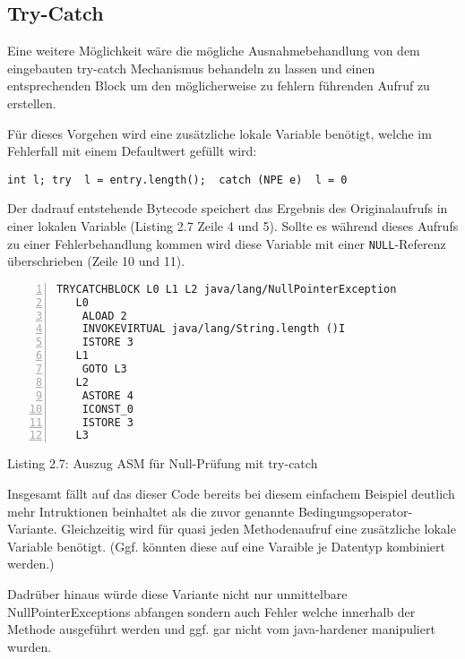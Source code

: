 \vspace{0.3cm}


\subsection{Try-Catch}

Eine weitere Möglichkeit wäre die mögliche Ausnahmebehandlung von dem eingebauten
try-catch Mechanismus behandeln zu lassen und einen entsprechenden Block um
den möglicherweise zu fehlern führenden Aufruf zu erstellen.

Für dieses Vorgehen wird eine zusätzliche lokale Variable benötigt,
welche im Fehlerfall mit einem Defaultwert gefüllt wird:

\texttt{int l; try { l = entry.length(); } catch (NPE e) { l = 0 }}

Der dadrauf entstehende Bytecode speichert das Ergebnis des Originalaufrufs
in einer lokalen Variable (Listing 2.7 Zeile 4 und 5). Sollte es während
dieses Aufrufs zu einer Fehlerbehandlung kommen wird diese Variable mit
einer \texttt{NULL}-Referenz überschrieben (Zeile 10 und 11).


\begin{lstlisting}[basicstyle=\ttfamily,numbers=left,numberstyle=\footnotesize\ttfamily,backgroundcolor=\color{source}]
    TRYCATCHBLOCK L0 L1 L2 java/lang/NullPointerException
   L0
    ALOAD 2
    INVOKEVIRTUAL java/lang/String.length ()I
    ISTORE 3
   L1
    GOTO L3
   L2
    ASTORE 4
    ICONST_0
    ISTORE 3
   L3
\end{lstlisting}
\centerline{Listing 2.7: Auszug ASM für Null-Prüfung mit try-catch}

\vspace{0.3cm}

Insgesamt fällt auf das dieser Code bereits bei diesem einfachem Beispiel deutlich
mehr Intruktionen beinhaltet als die zuvor genannte Bedingungsoperator-Variante.
Gleichzeitig wird für quasi jeden Methodenaufruf eine zusätzliche lokale Variable
benötigt. (Ggf. könnten diese auf eine Varaible je Datentyp kombiniert werden.)

Dadrüber hinaus würde diese Variante nicht nur unmittelbare NullPointerExceptions
abfangen sondern auch Fehler welche innerhalb der Methode ausgeführt werden und
ggf. gar nicht vom java-hardener manipuliert wurden.

